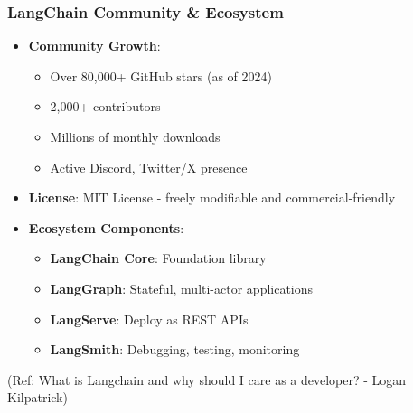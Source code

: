 \begin{frame}[fragile]\frametitle{LangChain Community \& Ecosystem}

\begin{itemize}
\item \textbf{Community Growth}:
	\begin{itemize}
	\item Over 80,000+ GitHub stars (as of 2024)
	\item 2,000+ contributors
	\item Millions of monthly downloads
	\item Active Discord, Twitter/X presence
	\end{itemize}
	
\item \textbf{License}: MIT License - freely modifiable and commercial-friendly

\item \textbf{Ecosystem Components}:
	\begin{itemize}
	\item \textbf{LangChain Core}: Foundation library
	\item \textbf{LangGraph}: Stateful, multi-actor applications
	\item \textbf{LangServe}: Deploy as REST APIs
	\item \textbf{LangSmith}: Debugging, testing, monitoring
	\end{itemize}
\end{itemize}

{\tiny (Ref: What is Langchain and why should I care as a developer? - Logan Kilpatrick)}

\end{frame}


